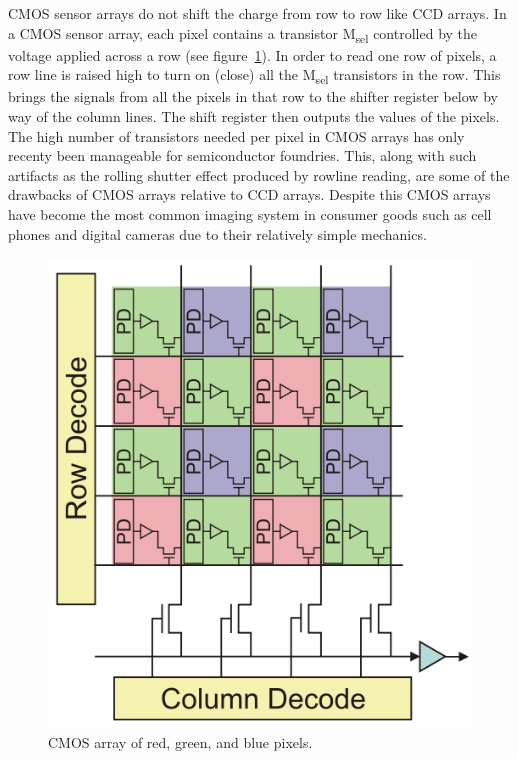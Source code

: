 CMOS sensor arrays do not shift the charge from row to row like CCD arrays.
%
In a CMOS sensor array, each pixel contains a transistor M\textsubscript{sel} controlled by the voltage applied across a row (see figure~\ref{fig:cmosarray}).
%
In order to read one row of pixels, a row line is raised high to turn on (close) all the M\textsubscript{sel} transistors in the row.
%
This brings the signals from all the pixels in that row to the shifter register below by way of the column lines.
%
The shift register then outputs the values of the pixels.
%
The high number of transistors needed per pixel in CMOS arrays has only recenty been manageable for semiconductor foundries.
%
This, along with such artifacts as the rolling shutter effect produced by rowline reading, are some of the drawbacks of CMOS arrays relative to CCD arrays.
%
Despite this CMOS arrays have become the most common imaging system in consumer goods such as cell phones and digital cameras due to their relatively simple mechanics.
\begin{figure}[!htbp]
	\center
	\includegraphics[width=.8\linewidth,keepaspectratio]{figures/background/cmos.png}
	\caption{CMOS array of red, green, and blue pixels.}
	\label{fig:cmosarray}
\end{figure}
